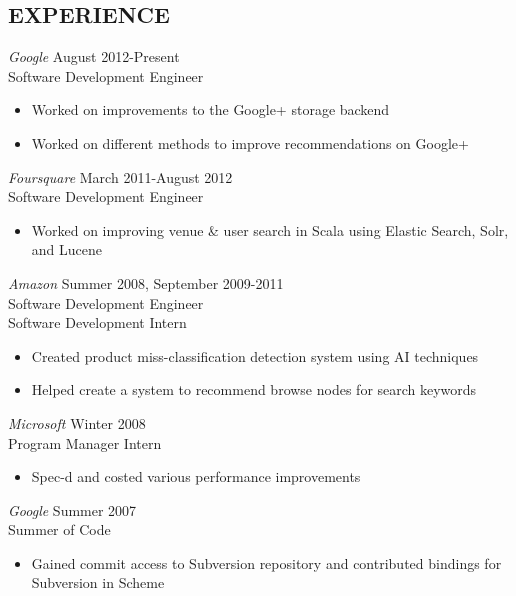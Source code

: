 \documentclass[10pt,line,margin=0.1]{newsres}
\begin{document}
\begin{resume}
\section{EXPERIENCE}
        {\sl Google} \hfill August 2012-Present\\
        Software Development Engineer
        \begin{itemize}  \itemsep -2pt %
          \item Worked on improvements to the Google+ storage backend
          \item Worked on different methods to improve recommendations on Google+
        \end{itemize}
        {\sl Foursquare} \hfill March 2011-August 2012\\
        Software Development Engineer
        \begin{itemize}  \itemsep -2pt %
        \item Worked on improving venue \& user search in Scala using Elastic Search, Solr, and Lucene
        \end{itemize}
                {\sl Amazon} \hfill            Summer 2008, September 2009-2011 \\
                Software Development Engineer \\
                Software Development Intern
                \begin{itemize}  \itemsep -2pt %
                \item Created product miss-classification detection system using AI techniques
                \item Helped create a system to recommend browse nodes for search keywords
                \end{itemize} 
                {\sl Microsoft} \hfill        Winter 2008 \\
                Program Manager Intern
                \begin{itemize}
                \item Spec-d and costed various performance improvements
                \end{itemize} 
                {\sl Google} \hfill        Summer 2007 \\
                Summer of Code
                  \begin{itemize}
                   \item Gained commit access to Subversion repository and contributed bindings for Subversion in Scheme

\end{itemize}
\end{resume}
\end{document}
